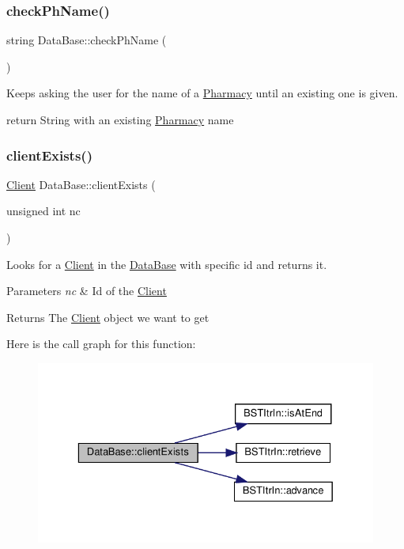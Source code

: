\subsubsection{\texorpdfstring{check\+Ph\+Name()}{checkPhName()}}
{\footnotesize\ttfamily string Data\+Base\+::check\+Ph\+Name (\begin{DoxyParamCaption}{ }\end{DoxyParamCaption})}



Keeps asking the user for the name of a \hyperlink{classPharmacy}{Pharmacy} until an existing one is given. 

return String with an existing \hyperlink{classPharmacy}{Pharmacy} name \mbox{\label{classDataBase_a8575c65a7f0d76352e4b37604562fbc2}} 
\subsubsection{\texorpdfstring{client\+Exists()}{clientExists()}}
{\footnotesize\ttfamily \hyperlink{classClient}{Client} Data\+Base\+::client\+Exists (\begin{DoxyParamCaption}\item[{unsigned int}]{nc }\end{DoxyParamCaption})}



Looks for a \hyperlink{classClient}{Client} in the \hyperlink{classDataBase}{Data\+Base} with specific id and returns it. 


\begin{DoxyParams}{Parameters}
{\em nc} & Id of the \hyperlink{classClient}{Client}\\
\hline
\end{DoxyParams}
\begin{DoxyReturn}{Returns}
The \hyperlink{classClient}{Client} object we want to get 
\end{DoxyReturn}
Here is the call graph for this function\+:\nopagebreak
\begin{figure}[H]
\begin{center}
\leavevmode
\includegraphics[width=329pt]{classDataBase_a8575c65a7f0d76352e4b37604562fbc2_cgraph}
\end{center}
\end{figure}
\mbox{\label{classDataBase_aa613181e1960fa22305feae26560960b}} 
